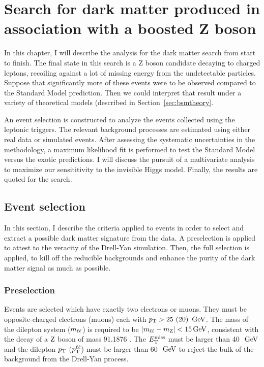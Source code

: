 \chapter{Search for dark matter produced in association with a boosted Z boson}
\label{chap:zlldm}

In this chapter, I will describe the analysis for the dark matter search from start to finish.
The final state in this search is a Z boson candidate decaying to charged leptons, recoiling against a lot of missing energy from the undetectable particles.
Suppose that significantly more of these events were to be observed compared to the Standard Model prediction.
Then we could interpret that result under a variety of theoretical models (described in Section~\ref{sec:bsmtheory}.

An event selection is constructed to analyze the events collected using the leptonic triggers.
The relevant background processes are estimated using either real data or simulated events.
After assessing the systematic uncertainties in the methodology, a maximum likelihood fit is performed to test the Standard Model versus the exotic predictions.
I will discuss the pursuit of a multivariate analysis to maximize our sensititivity to the invisible Higgs model.
Finally, the results are quoted for the search.

\section{Event selection}
\label{sec:zlldmsel}
In this section, I describe the criteria applied to events in order to select and extract a possible dark matter signature from the data.
A preselection is applied to attest to the veracity of the Drell-Yan simulation.
Then, the full selection is applied, to kill off the reducible backgrounds and enhance the purity of the dark matter signal as much as possible.

\subsection{Preselection}
\label{ss:zlldmpresel}
Events are selected which have exactly two electrons or muons.
They must be opposite-charged electrons (muons) each with $p_{\mathrm{T}} > 25~(20)~\,\text{Ge\hspace{-.08em}V}$.
The mass of the dilepton system ($m_{\ell\ell}$) is required to be $\left|m_{\ell\ell}-m_{\mathrm{Z}}\right| < 15\,\text{Ge\hspace{-.08em}V}$, consistent with the decay of a $\mathrm{Z}$ boson of mass 91.1876 \GeV.
The $E_\mathrm{T}^{\mathrm{miss}}$ must be larger than 40~$\,\text{Ge\hspace{-.08em}V}$ and the dilepton 
$p_{\mathrm{T}}$ ($p_{\mathrm{T}}^{\ell\ell}$) must be larger than 60~$\,\text{Ge\hspace{-.08em}V}$ to reject the bulk of the background from the Drell-Yan process.

